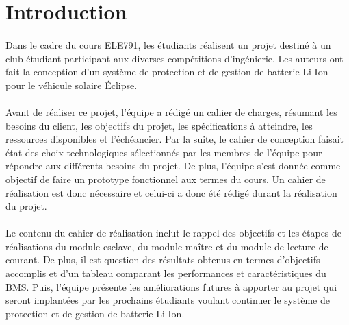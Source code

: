 \section{Introduction}

	\paragraph{}
	Dans le cadre du cours ELE791, les étudiants réalisent un projet destiné à un club étudiant participant aux diverses compétitions d’ingénierie. Les auteurs ont fait la conception d’un système de protection et de gestion de batterie Li-Ion pour le véhicule solaire Éclipse. 
	
	\paragraph{}
	Avant de réaliser ce projet, l’équipe a rédigé un cahier de charges, résumant les besoins du client, les objectifs du projet, les spécifications à atteindre, les ressources disponibles et l’échéancier. Par la suite, le cahier de conception faisait état des choix technologiques sélectionnés par les membres de l’équipe pour répondre aux différents besoins du projet. De plus, l’équipe s’est donnée comme objectif de faire un prototype fonctionnel aux termes du cours. Un cahier de réalisation est donc nécessaire et celui-ci a donc été rédigé durant la réalisation du projet.
	
	\paragraph{}
	Le contenu du cahier de réalisation inclut le rappel des objectifs et les étapes de réalisations du module esclave, du module maître et du module de lecture de courant. De plus, il est question des résultats obtenus en termes d’objectifs accomplis et d’un tableau comparant les performances et caractéristiques du BMS. Puis, l’équipe présente les améliorations futures à apporter au projet qui seront implantées par les prochains étudiants voulant continuer le système de protection et de gestion de batterie Li-Ion.

